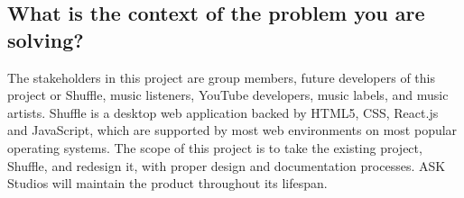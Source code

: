 \documentclass[12pt, a4paper]{article}
\begin{document}
\subsection{What is the context of the problem you are solving?}
The stakeholders in this project are group members, future developers of this project or Shuffle, music listeners, YouTube developers, music labels, and music artists.  \color{red}Shuffle is a desktop web application backed by HTML5, CSS, React.js and JavaScript, which are supported by most web environments on most popular operating systems.  \color{black}The scope of this project is to take the existing project, Shuffle, and redesign it, with proper design and documentation processes.  ASK Studios will maintain the product throughout its lifespan.
\end{document}
